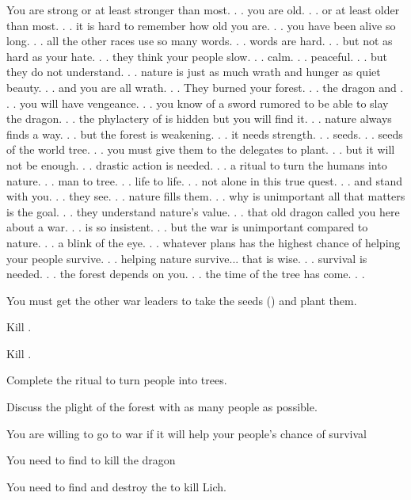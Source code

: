 \documentclass[char]{guildcamp2}
\begin{document}
\name{\cEnt{}}




You are strong or at least stronger than most. . . you are old. . . or at least older than most. . . it is hard to remember how old you are. . . you have been alive so long. . . all the other races use so many words. . . words are hard. . . but not as hard as your hate. . . they think your people slow. . . calm. . . peaceful. . . but they do not understand. . . nature is just as much wrath and hunger as quiet beauty. . . and you are all wrath. . . They burned your forest. . . \cRed{} the dragon and \cLich{}. . . you will have vengeance. . . you know of a sword rumored to be able to slay the dragon. . . the phylactery of \cLich{} is hidden but you will find it. . . nature always finds a way. . .  but the forest is weakening. . . it needs strength. . . seeds. . . seeds of the world tree. . . you must give them to the delegates to plant. . . but it will not be enough. . . drastic action is needed. . . a ritual to turn the humans into nature. . . man to tree. . . life to life. . . not alone in this true quest. . . \cTreeFae{} and \cTroll{} stand with you. . . they see. . . nature fills them. . . why is unimportant all that matters is the goal. . . they understand nature's value. . . that old dragon called you here about a war. . . \cOnyx{} is so insistent. . . but the war is unimportant compared to nature. . . a blink of the eye. . . whatever plans has the highest chance of helping your people survive. . . helping nature survive... that is wise. . . survival is needed. . . the forest depends on you. . . the time of the tree has come. . .

\begin{itemz}[Goals]
  \item You must get the other war leaders to take the seeds (\iSeedoftheWorldTree{}) and plant them.
  \item Kill \cRed{}.
	\item Kill \cLich{}.
  \item Complete the ritual to turn people into trees.
	\item Discuss the plight of the forest with as many people as possible.
\end{itemz}

\begin{itemz}[Notes]
  \item You are willing to go to war if it will help your people's chance of survival 
  \item You need to find \iSwordofIce{} to kill the dragon
	\item You need to find and destroy the \iPhylactery{} to kill Lich.
\end{itemz}
\end{document}
